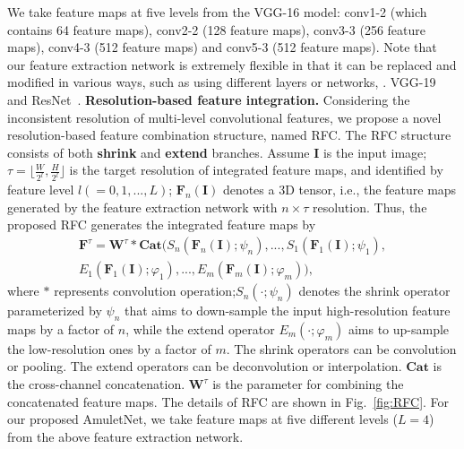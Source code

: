 \documentclass[10pt,twocolumn,letterpaper]{article}
\begin{document}
%
We take feature maps at five levels from the VGG-16 model: conv1-2 (which contains 64 feature maps), conv2-2 (128 feature maps), conv3-3 (256 feature maps), conv4-3 (512 feature maps) and conv5-3 (512 feature maps).
%
Note that our feature extraction network is extremely flexible in that it can be replaced and modified in various ways, such as using different layers or networks, \eg. VGG-19~\cite{simonyan2014very} and ResNet~\cite{He2016Deep}.%
\vspace{-2mm}
{\flushleft \textbf{Resolution-based feature integration.}}
Considering the inconsistent resolution of multi-level convolutional features, we propose a novel resolution-based feature combination structure, named RFC.
%
The RFC structure consists of both \textbf{shrink} and \textbf{extend} branches.
%
Assume $\textbf{I}$ is the input image; $\tau=\lfloor\frac{W}{2^l},\frac{H}{2^l}\rfloor$ is the target resolution of integrated feature maps, and identified by feature level $l(=0,1,...,L)$; $\textbf{F}_{n}(\textbf{I})$ denotes a 3D tensor, i.e., the feature maps generated by the feature extraction network with $n\times \tau$ resolution.
%
Thus, the proposed RFC generates the integrated feature maps by
\begin{equation}
  \label{equ:equ1}
\begin{aligned}
 \textbf{F}^{\tau} = \textbf{W}^{\tau}*\textbf{Cat}(S_{n}(\textbf{F}_{n}(\textbf{I});\psi_{n}),...,S_{1}(\textbf{F}_{1}(\textbf{I});\psi_{1}),\\ E_{1}(\textbf{F}_{1}(\textbf{I});\varphi_{1}),...,E_{m}(\textbf{F}_{m}(\textbf{I});\varphi_{m})),
\end{aligned}
\end{equation}
%
where $*$ represents convolution operation;$S_{n}(\cdot;\psi_{n})$ denotes the shrink operator parameterized by $\psi_{n}$ that aims to down-sample the input high-resolution feature maps by a factor of $n$, while the extend operator $E_{m}(\cdot;\varphi_{m})$ aims to up-sample the low-resolution ones by a factor of $m$.
%
The shrink operators can be convolution or pooling. The extend operators can be deconvolution or interpolation.
%
$\textbf{Cat}$ is the cross-channel concatenation.
%
$\textbf{W}^{\tau}$ is the parameter for combining the concatenated feature maps.
%
The details of RFC are shown in Fig.~\ref{fig:RFC}.
%
For our proposed AmuletNet, we take feature maps at five different levels ($L=4$) from the above feature extraction network.
%
\end{document}
